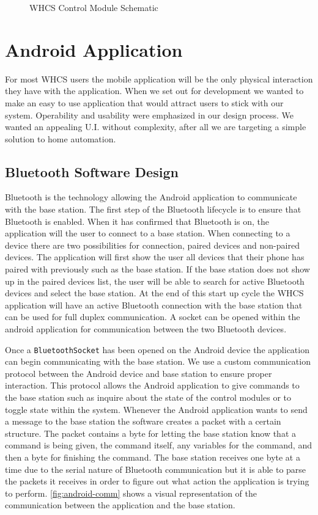 \documentclass[draft,twocolumn,letterpaper,10pt]{IEEEtran}
\newcommand{\ucffig}[3]{
\begin{figure}[h]
\centering
\makebox[\linewidth][c]{
#2
}
\caption{#3}
\label{#1}
\end{figure}
}
\newcommand{\ucfgfx}[4][scale=1.0]{
\ucffig{#2}{\texttt{[image: \#3]}}{#4}
}
\begin{document}
\ucfgfx[width=\linewidth]{fig:ctrl-mod-sch}{a686SchematicBreakdownExpected2pages-img001.png}
{WHCS Control Module Schematic}

\section{Android Application}
For most WHCS users the mobile application
will be the only physical interaction they have with the application. When we
set out for development we wanted to make an easy to use application that would
attract users to stick with our system.  Operability and usability were
emphasized in our design process. We wanted an appealing U.I. without
complexity, after all we are targeting a simple solution to home automation.

\subsection{Bluetooth Software Design}
Bluetooth is the technology allowing the Android application to communicate
with the base station. The first step of the Bluetooth lifecycle is to ensure
that Bluetooth is enabled. When it has confirmed that Bluetooth is on, the
application will the user to connect to a base station. When connecting to a
device there are two possibilities for connection, paired devices and
non-paired devices. The application will first show the user all devices that
their phone has paired with previously such as the base station.  If the base
station does not show up in the paired devices list, the user will be able to
search for active Bluetooth devices and select the base station. At the end of
this start up cycle the WHCS application will have an active Bluetooth
connection with the base station that can be used for full duplex
communication. A socket can be opened within the android application for
communication between the two Bluetooth devices.

Once a \texttt{BluetoothSocket} has
been opened on the Android device the application can begin communicating with
the base station. We use a custom communication protocol between the Android
device and base station to ensure proper interaction. This protocol allows the
Android application to give commands to the base station such as inquire about
the state of the control modules or to toggle state within the system. Whenever
the Android application wants to send a message to the base station the
software creates a packet with a certain structure. The packet contains a byte
for letting the base station know that a command is being given, the command
itself, any variables for the command, and then a byte for finishing the
command. The base station receives one byte at a time due to the serial nature
of Bluetooth communication but it is able to parse the packets it receives in
order to figure out what action the application is trying to perform. \autoref{fig:android-comm} shows a visual representation of the communication between the application and
the base station.
\end{document}
